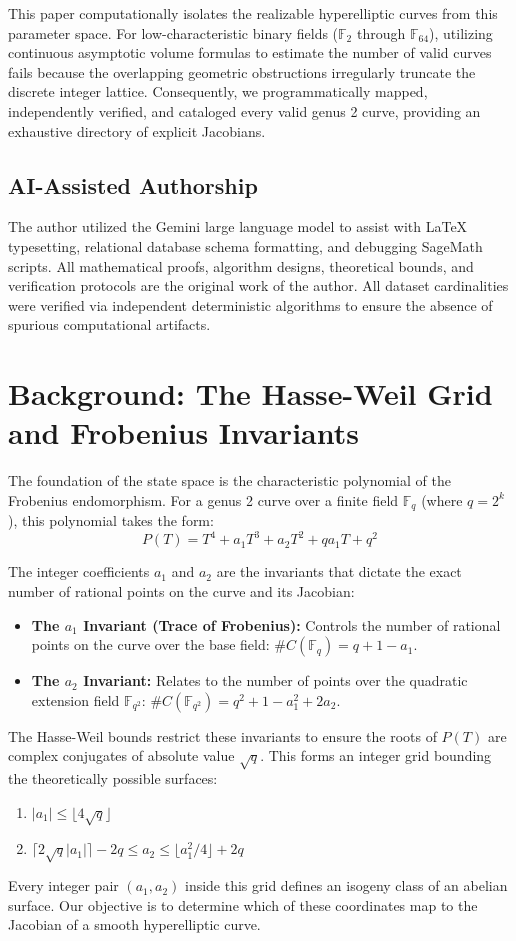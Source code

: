 \documentclass[12pt, letterpaper]{article}
\begin{document}
This paper computationally isolates the realizable hyperelliptic curves from this parameter space. For low-characteristic binary fields ($\mathbb{F}_2$ through $\mathbb{F}_{64}$), utilizing continuous asymptotic volume formulas to estimate the number of valid curves fails because the overlapping geometric obstructions irregularly truncate the discrete integer lattice. Consequently, we programmatically mapped, independently verified, and cataloged every valid genus 2 curve, providing an exhaustive directory of explicit Jacobians.

\subsection{AI-Assisted Authorship}
The author utilized the Gemini large language model \cite{Gemini2026} to assist with \LaTeX{} typesetting, relational database schema formatting, and debugging SageMath scripts. All mathematical proofs, algorithm designs, theoretical bounds, and verification protocols are the original work of the author. All dataset cardinalities were verified via independent deterministic algorithms to ensure the absence of spurious computational artifacts.

\section{Background: The Hasse-Weil Grid and Frobenius Invariants}
The foundation of the state space is the characteristic polynomial of the Frobenius endomorphism. For a genus 2 curve over a finite field $\mathbb{F}_q$ (where $q = 2^k$), this polynomial takes the form:
\[ P(T) = T^4 + a_1 T^3 + a_2 T^2 + q a_1 T + q^2 \]

The integer coefficients $a_1$ and $a_2$ are the invariants that dictate the exact number of rational points on the curve and its Jacobian:
\begin{itemize}
    \item \textbf{The $a_1$ Invariant (Trace of Frobenius):} Controls the number of rational points on the curve over the base field: $\#C(\mathbb{F}_q) = q + 1 - a_1$.
    \item \textbf{The $a_2$ Invariant:} Relates to the number of points over the quadratic extension field $\mathbb{F}_{q^2}$: $\#C(\mathbb{F}_{q^2}) = q^2 + 1 - a_1^2 + 2a_2$.
\end{itemize}

The Hasse-Weil bounds restrict these invariants to ensure the roots of $P(T)$ are complex conjugates of absolute value $\sqrt{q}$. This forms an integer grid bounding the theoretically possible surfaces:
\begin{enumerate}
    \item $|a_1| \le \lfloor 4\sqrt{q} \rfloor$
    \item $\lceil 2\sqrt{q}|a_1| \rceil - 2q \le a_2 \le \lfloor a_1^2/4 \rfloor + 2q$
\end{enumerate}
Every integer pair $(a_1, a_2)$ inside this grid defines an isogeny class of an abelian surface. Our objective is to determine which of these coordinates map to the Jacobian of a smooth hyperelliptic curve.
\end{document}
